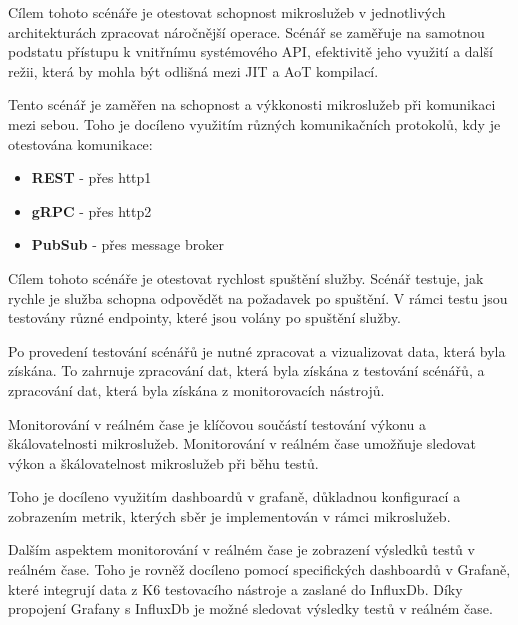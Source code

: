Cílem tohoto scénáře je otestovat schopnost mikroslužeb v jednotlivých architekturách zpracovat náročnější operace. Scénář se zaměřuje na samotnou podstatu přístupu k vnitřnímu systémového API, efektivitě jeho využití a další režii, která by mohla být odlišná mezi JIT a AoT kompilací.


Tento scénář je zaměřen na schopnost a výkkonosti mikroslužeb při komunikaci mezi sebou. Toho je docíleno využitím různých komunikačních protokolů, kdy je otestována komunikace:

\begin{itemize}
    \item \textbf{REST} - přes http1
    \item \textbf{gRPC} - přes http2
    \item \textbf{PubSub} - přes message broker
\end{itemize}


Cílem tohoto scénáře je otestovat rychlost spuštění služby. Scénář testuje, jak rychle je služba schopna odpovědět na požadavek po spuštění. V rámci testu jsou testovány různé endpointy, které jsou volány po spuštění služby.


Po provedení testování scénářů je nutné zpracovat a vizualizovat data, která byla získána. To zahrnuje zpracování dat, která byla získána z testování scénářů, a zpracování dat, která byla získána z monitorovacích nástrojů.


Monitorování v reálném čase je klíčovou součástí testování výkonu a škálovatelnosti mikroslužeb. Monitorování v reálném čase umožňuje sledovat výkon a škálovatelnost mikroslužeb při běhu testů.

Toho je docíleno využitím dashboardů v grafaně, důkladnou konfigurací a zobrazením metrik, kterých sběr je implementován v rámci mikroslužeb.

Dalším aspektem monitorování v reálném čase je zobrazení výsledků testů v reálném čase. Toho je rovněž docíleno pomocí specifických dashboardů v Grafaně, které integrují data z K6 testovacího nástroje a zaslané do InfluxDb. Díky propojení Grafany s InfluxDb je možné sledovat výsledky testů v reálném čase.


